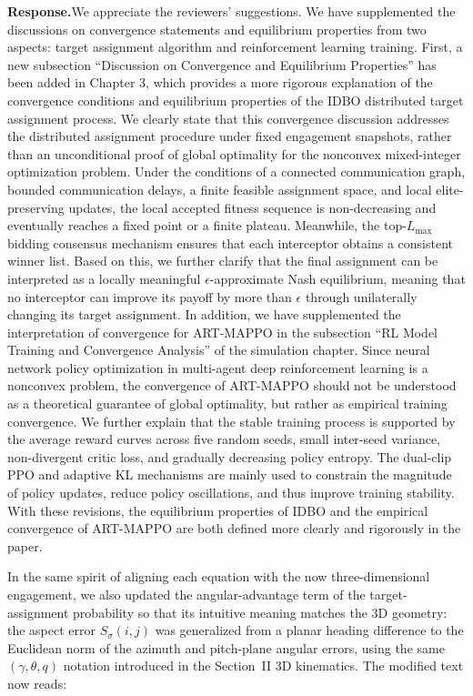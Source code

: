 \documentclass[11pt]{article}
\newcommand{\rsp}{\medskip\noindent\textbf{Response.}\quad}
\begin{document}
\rsp We appreciate the reviewers’ suggestions. We have supplemented the discussions on convergence statements and equilibrium properties from two aspects: target assignment algorithm and reinforcement learning training.
First, a new subsection “Discussion on Convergence and Equilibrium Properties” has been added in Chapter 3, which provides a more rigorous explanation of the convergence conditions and equilibrium properties of the IDBO distributed target assignment process. We clearly state that this convergence discussion addresses the distributed assignment procedure under fixed engagement snapshots, rather than an unconditional proof of global optimality for the nonconvex mixed-integer optimization problem. Under the conditions of a connected communication graph, bounded communication delays, a finite feasible assignment space, and local elite-preserving updates, the local accepted fitness sequence is non-decreasing and eventually reaches a fixed point or a finite plateau. Meanwhile, the top-\(L_{\max}\) bidding consensus mechanism ensures that each interceptor obtains a consistent winner list. Based on this, we further clarify that the final assignment can be interpreted as a locally meaningful \(\epsilon\)-approximate Nash equilibrium, meaning that no interceptor can improve its payoff by more than \(\epsilon\) through unilaterally changing its target assignment.
In addition, we have supplemented the interpretation of convergence for ART-MAPPO in the subsection “RL Model Training and Convergence Analysis” of the simulation chapter. Since neural network policy optimization in multi-agent deep reinforcement learning is a nonconvex problem, the convergence of ART-MAPPO should not be understood as a theoretical guarantee of global optimality, but rather as empirical training convergence. We further explain that the stable training process is supported by the average reward curves across five random seeds, small inter-seed variance, non-divergent critic loss, and gradually decreasing policy entropy. The dual-clip PPO and adaptive KL mechanisms are mainly used to constrain the magnitude of policy updates, reduce policy oscillations, and thus improve training stability.
With these revisions, the equilibrium properties of IDBO and the empirical convergence of ART-MAPPO are both defined more clearly and rigorously in the paper.

In the same spirit of aligning each equation with the now three-dimensional engagement, we also updated the angular-advantage term of the target-assignment probability so that its intuitive meaning matches the 3D geometry: the aspect error $S_{\sigma}(i,j)$ was generalized from a planar heading difference to the Euclidean norm of the azimuth and pitch-plane angular errors, using the same $(\gamma,\theta,q)$ notation introduced in the Section~II 3D kinematics. The modified text now reads:
\end{document}
